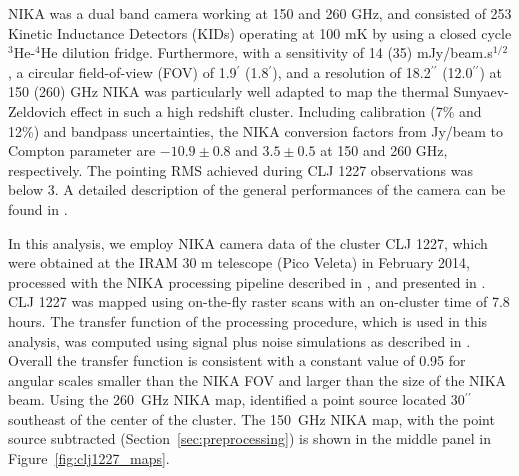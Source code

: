 \documentclass[twocolumn,traditabstract]{aa}
\begin{document}
NIKA \citep{monfardini2010,monfardini2014} was a dual band camera working at 150 and
260 GHz, and consisted of 253 Kinetic Inductance Detectors (KIDs) operating at 100 mK by using a closed cycle $^3$He-$^4$He dilution fridge. 
Furthermore, with a sensitivity of 14 (35) mJy/beam.s$^{1/2}$ , a circular field-of-view (FOV) of 1.9$^{\prime}$ (1.8$^{\prime}$), and a
resolution of 18.2$^{\prime \prime}$ (12.0$^{\prime \prime}$) at 150 (260) GHz NIKA was particularly well adapted to map the thermal
Sunyaev-Zeldovich effect in such a high redshift cluster. Including calibration (7\% and 12\%) and bandpass uncertainties, the NIKA conversion
factors from Jy/beam to Compton parameter are $-10.9 \pm 0.8$ and $3.5\pm0.5$ at 150 and 260 GHz, respectively. The pointing RMS
achieved during CLJ 1227 observations was below 3\asec.
A detailed description of the general performances of the camera can be found in \citet{catalano2014,adam2014}.

In this analysis, we employ NIKA camera data of the cluster CLJ 1227, which were obtained at the IRAM 30 m telescope (Pico Veleta)
in February 2014, processed with the NIKA processing pipeline described in \citet{adam2014}, and  presented in \citet{adam2015}.
CLJ 1227 was mapped using on-the-fly raster scans with an on-cluster time of 7.8 hours.
The transfer function of the processing procedure, which is used in this analysis, was computed using signal plus noise simulations as
described in \citet{adam2015}.
Overall the transfer function is consistent with a constant value of 0.95 for angular scales smaller than the NIKA FOV and larger
than the size of the NIKA beam. Using the 260~GHz NIKA map, \citet{adam2015} identified a point source located 30$^{\prime \prime}$
southeast of the center of the cluster. The 150~GHz NIKA map, with the point source subtracted (Section~\ref{sec:preprocessing})
is shown in the middle panel in Figure~\ref{fig:clj1227_maps}.
\end{document}

